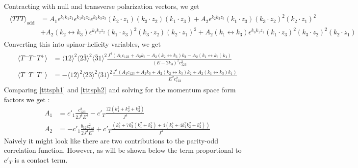 \documentclass[a4paper,11pt]{article}
\begin{document}
Contracting with null and transverse polarization vectors, we get
\begin{align}\label{TTTmomspace}
\begin{split}
\langle TTT \rangle_{\text{odd}}&= A_1 \epsilon^{k_3 k_1 z_1}\epsilon^{k_1 k_2 z_2}\epsilon^{k_2 k_3 z_3}(k_2 \cdot z_1)(k_3 \cdot z_2)(k_1 \cdot z_3)+ A_2 \epsilon^{k_2 k_3 z_3}(k_1 \cdot z_3)(k_3 \cdot z_2)^2(k_2 \cdot z_1)^2\\[5 pt]
&+ A_2 (k_2 \leftrightarrow k_3)\epsilon^{k_1 k_2 z_2}(k_1 \cdot z_3)^2(k_3 \cdot z_2)(k_2 \cdot z_1)^2+ A_2 (k_1 \leftrightarrow k_3)\epsilon^{k_3 k_1 z_1}(k_1 \cdot z_3)^2(k_3 \cdot z_2)^2(k_2 \cdot z_1)
\end{split}
\end{align}
Converting this into spinor-helicity variables, we get
\begin{align}\label{tttsph2}
\begin{split}
\langle T^-T^-T^+ \rangle &= \langle 12 \rangle^2 \langle 2\bar{3} \rangle^2 \langle \bar{3}1 \rangle^2\frac{J^4 \left(A_1 c_{123}+A_2 k_3-A_2(k_2 \leftrightarrow k_3)k_2-A_2(k_1 \leftrightarrow k_3)k_1\right)}{(E-2k_3)^2 c_{123}^2}\\[5 pt]
\langle T^-T^-T^- \rangle &= -\langle 12 \rangle^2 \langle 23 \rangle^2 \langle 31 \rangle^2\frac{J^4 \left(A_1 c_{123}+A_2 k_3+A_2(k_2 \leftrightarrow k_3)k_2+A_2(k_1 \leftrightarrow k_3)k_1\right)}{E^2 c_{123}^2}
\end{split}
\end{align}
 Comparing \eqref{tttsph1} and \eqref{tttsph2} and solving for the momentum space form factors we get : %
\begin{align}\label{sola1a2}
A_1 &=c'_1\frac{c_{123}^2}{2J^4 E^4}-c'_T \frac{12(k_1^2+k_2^2+k_3^2)}{J^4}\\[5 pt]
A_2 &= -c'_1\frac{b_{12}c^2_{123}}{2J^4 E^4}+c'_T\frac{\left(k_3^4+7k_3^2(k_1^2+k_2^2)+4(k_1^4+4k_1^2 k_2^2+k_2^4)\right)}{J^4}
\end{align}
Naively it might look like there are two contributions to the parity-odd correlation function. However, as will be shown below the term proportional to $c'_T$ is a contact term. 
\end{document}
